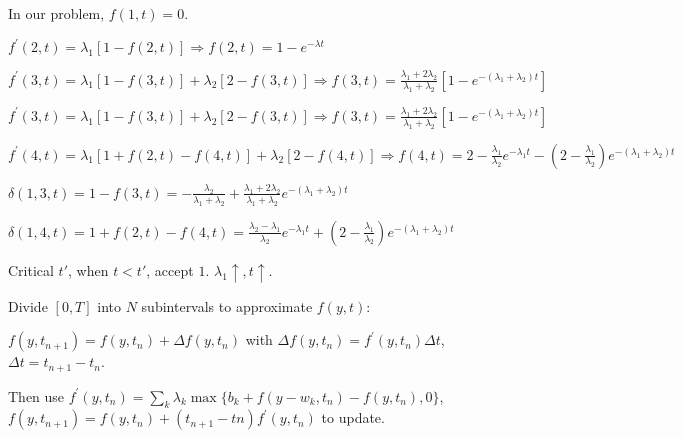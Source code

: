In our problem, $f(1,t) = 0$.

$f^{\prime}(2, t) = \lambda_1 [1- f(2,t)] \Rightarrow f(2,t) = 1- e^{-\lambda t}$

$f^{\prime}(3, t) = \lambda_1 [1- f(3,t)] + \lambda_2 [2 - f(3,t)] \Rightarrow f(3,t) = \frac{\lambda_1 + 2 \lambda_2}{\lambda_1 + \lambda_2} [1- e^{-(\lambda_1 + \lambda_2) t}]$

$f^{\prime}(3, t) = \lambda_1 [1- f(3,t)] + \lambda_2 [2 - f(3,t)] \Rightarrow f(3,t) = \frac{\lambda_1 + 2 \lambda_2}{\lambda_1 + \lambda_2} [1- e^{-(\lambda_1 + \lambda_2) t}]$

$f^{\prime}(4, t) = \lambda_1 [1 + f(2,t) - f(4,t)] + \lambda_2 [2 - f(4,t)] \Rightarrow f(4,t) = 2- \frac{\lambda_1}{\lambda_2} e^{-\lambda_1 t} - (2- \frac{\lambda_1}{\lambda_2}) e^{-(\lambda_1 + \lambda_2)t}$

$\delta(1,3,t) = 1- f(3,t) = - \frac{\lambda_2}{\lambda_1 + \lambda_2} + \frac{\lambda_1 + 2 \lambda_2}{\lambda_1 + \lambda_2} e^{-(\lambda_1 + \lambda_2)t}$

$\delta(1,4,t) = 1+ f(2,t) - f(4,t) = \frac{\lambda_2- \lambda_1}{\lambda_2} e^{-\lambda_1 t} + (2- \frac{\lambda_1}{\lambda_2}) e^{-(\lambda_1 + \lambda_2)t}$

Critical $t{'}$, when $t < t{'}$, accept $1$.  $\lambda_1 \uparrow, t \uparrow$.

Divide $[0, T]$ into $N$ subintervals to approximate $f(y,t)$:

$f(y,t_{n+1}) = f(y, t_n) + \Delta f(y, t_n)$ with $\Delta f(y, t_n) = f^{'}(y, t_n) \Delta t$, $\Delta t = t_{n+1} - t_{n}$.

Then use $f^{\prime} (y, t_n) = \sum_k \lambda_k \max\{b_k + f(y-w_k, t_n)- f(y, t_n), 0\}$, $f(y, t_{n+1}) = f(y, t_n) + (t_{n+1} - t{n}) f^{\prime}(y, t_n)$ to update.
